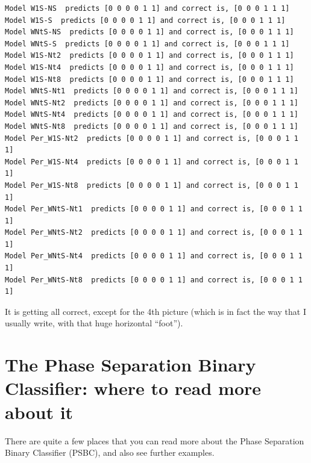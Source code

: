 \documentclass[openany,twoside]{book}
\begin{document}
\begin{verbatim}
Model W1S-NS  predicts [0 0 0 0 1 1] and correct is, [0 0 0 1 1 1]
Model W1S-S  predicts [0 0 0 0 1 1] and correct is, [0 0 0 1 1 1]
Model WNtS-NS  predicts [0 0 0 0 1 1] and correct is, [0 0 0 1 1 1]
Model WNtS-S  predicts [0 0 0 0 1 1] and correct is, [0 0 0 1 1 1]
Model W1S-Nt2  predicts [0 0 0 0 1 1] and correct is, [0 0 0 1 1 1]
Model W1S-Nt4  predicts [0 0 0 0 1 1] and correct is, [0 0 0 1 1 1]
Model W1S-Nt8  predicts [0 0 0 0 1 1] and correct is, [0 0 0 1 1 1]
Model WNtS-Nt1  predicts [0 0 0 0 1 1] and correct is, [0 0 0 1 1 1]
Model WNtS-Nt2  predicts [0 0 0 0 1 1] and correct is, [0 0 0 1 1 1]
Model WNtS-Nt4  predicts [0 0 0 0 1 1] and correct is, [0 0 0 1 1 1]
Model WNtS-Nt8  predicts [0 0 0 0 1 1] and correct is, [0 0 0 1 1 1]
Model Per_W1S-Nt2  predicts [0 0 0 0 1 1] and correct is, [0 0 0 1 1 1]
Model Per_W1S-Nt4  predicts [0 0 0 0 1 1] and correct is, [0 0 0 1 1 1]
Model Per_W1S-Nt8  predicts [0 0 0 0 1 1] and correct is, [0 0 0 1 1 1]
Model Per_WNtS-Nt1  predicts [0 0 0 0 1 1] and correct is, [0 0 0 1 1 1]
Model Per_WNtS-Nt2  predicts [0 0 0 0 1 1] and correct is, [0 0 0 1 1 1]
Model Per_WNtS-Nt4  predicts [0 0 0 0 1 1] and correct is, [0 0 0 1 1 1]
Model Per_WNtS-Nt8  predicts [0 0 0 0 1 1] and correct is, [0 0 0 1 1 1]
\end{verbatim}

It is getting all correct, except for the 4th picture (which is in fact the way that I usually write, with that huge horizontal ``foot'').

\hypertarget{the-phase-separation-binary-classifier-where-to-read-more-about-it}{%
\chapter{The Phase Separation Binary Classifier: where to read more about it}\label{the-phase-separation-binary-classifier-where-to-read-more-about-it}}

There are quite a few places that you can read more about the Phase Separation Binary Classifier (PSBC), and also see further examples.
\end{document}
